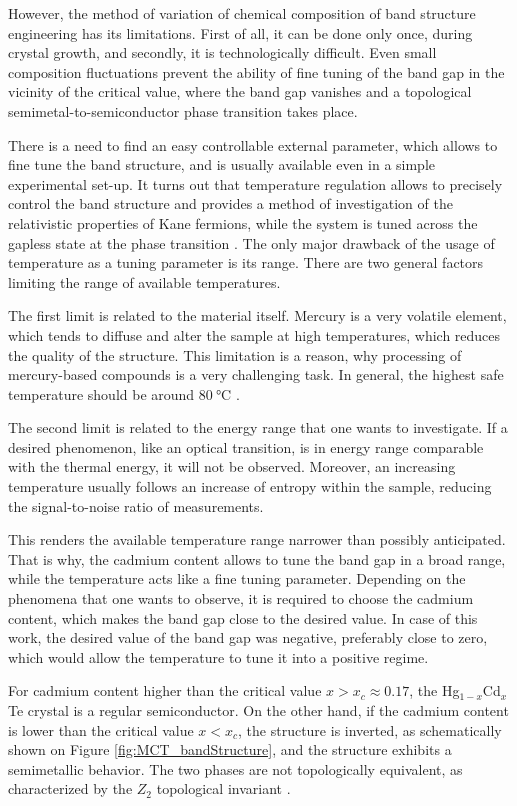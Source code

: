 \documentclass[titlepage,a4paper]{book}
\begin{document}
However, the method of variation of chemical composition of band structure engineering has its limitations. First of all, it can be done only once, during crystal growth, and secondly, it is technologically difficult. Even small composition fluctuations prevent the ability of fine tuning of the band gap in the vicinity of the critical value, where the band gap vanishes and a topological semimetal-to-semiconductor phase transition takes place.

There is a need to find an easy controllable external parameter, which allows to fine tune the band structure, and is usually available even in a simple experimental set-up. It turns out that temperature regulation allows to precisely control the band structure and provides a method of investigation of the relativistic properties of Kane fermions, while the system is tuned across the gapless state at the phase transition \cite{Teppe_MCT}. The only major drawback of the usage of temperature as a tuning parameter is its range. There are two general factors limiting the range of available temperatures. 

The first limit is related to the material itself. Mercury is a very volatile element, which tends to diffuse and alter the sample at high temperatures, which reduces the quality of the structure. This limitation is a reason, why processing of mercury-based compounds is a very challenging task. In general, the highest safe temperature should be around $\SI{80}{\degreeCelsius}$ \cite{Daumer_MCT_temperature}.

The second limit is related to the energy range that one wants to investigate. If a desired phenomenon, like an optical transition, is in energy range comparable with the thermal energy, it will not be observed. Moreover, an increasing temperature usually follows an increase of entropy within the sample, reducing the signal-to-noise ratio of measurements.

This renders the available temperature range narrower than possibly anticipated. That is why, the cadmium content allows to tune the band gap in a broad range, while the temperature acts like a fine tuning parameter. Depending on the phenomena that one wants to observe, it is required to choose the cadmium content, which makes the band gap close to the desired value. In case of this work, the desired value of the band gap was negative, preferably close to zero, which would allow the temperature to tune it into a  positive regime. 

For cadmium content higher than the critical value $x > x_c \approx 0.17$, the Hg$_{1-x}$Cd$_x$Te crystal is a regular semiconductor. On the other hand, if the cadmium content is lower than the critical value $x < x_c$, the structure is inverted, as schematically shown on Figure \ref{fig:MCT_bandStructure}, and the structure exhibits a semimetallic behavior. The two phases are not topologically equivalent, as characterized by the $Z_2$ topological invariant \cite{Bernevig_Topology2}.
\end{document}
